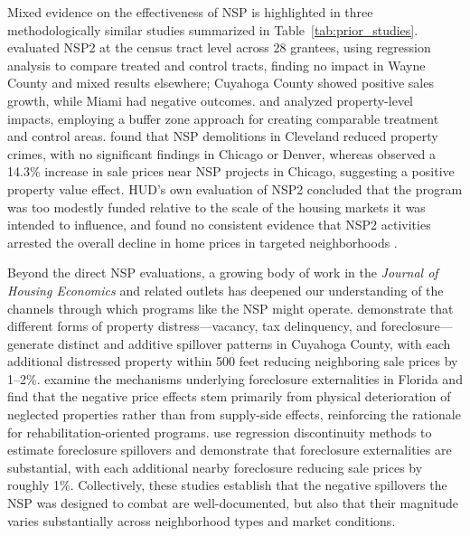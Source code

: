 \documentclass[12pt,authoryear]{elsarticle}
\begin{document}
Mixed evidence on the effectiveness of NSP is highlighted in three methodologically similar studies summarized in Table~\ref{tab:prior_studies}. \citet{schuetz2016} evaluated NSP2 at the census tract level across 28 grantees, using regression analysis to compare treated and control tracts, finding no impact in Wayne County and mixed results elsewhere; Cuyahoga County showed positive sales growth, while Miami had negative outcomes. \citet{spader2016} and \citet{bak2017} analyzed property-level impacts, employing a buffer zone approach for creating comparable treatment and control areas. \citet{spader2016} found that NSP demolitions in Cleveland reduced property crimes, with no significant findings in Chicago or Denver, whereas \citet{bak2017} observed a 14.3\% increase in sale prices near NSP projects in Chicago, suggesting a positive property value effect. HUD's own evaluation of NSP2 concluded that the program was too modestly funded relative to the scale of the housing markets it was intended to influence, and found no consistent evidence that NSP2 activities arrested the overall decline in home prices in targeted neighborhoods \citep{hudevaluation2015}.

Beyond the direct NSP evaluations, a growing body of work in the \textit{Journal of Housing Economics} and related outlets has deepened our understanding of the channels through which programs like the NSP might operate. \citet{whitaker2013} demonstrate that different forms of property distress---vacancy, tax delinquency, and foreclosure---generate distinct and additive spillover patterns in Cuyahoga County, with each additional distressed property within 500 feet reducing neighboring sale prices by 1--2\%. \citet{ihlanfeldt2016} examine the mechanisms underlying foreclosure externalities in Florida and find that the negative price effects stem primarily from physical deterioration of neglected properties rather than from supply-side effects, reinforcing the rationale for rehabilitation-oriented programs. \citet{cui2015} use regression discontinuity methods to estimate foreclosure spillovers and demonstrate that foreclosure externalities are substantial, with each additional nearby foreclosure reducing sale prices by roughly 1\%. Collectively, these studies establish that the negative spillovers the NSP was designed to combat are well-documented, but also that their magnitude varies substantially across neighborhood types and market conditions.
\end{document}
